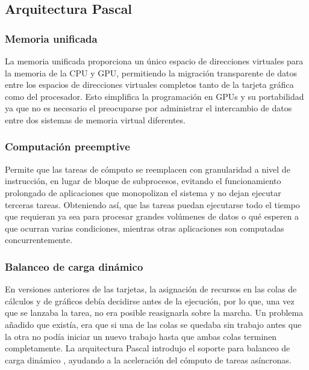\subsection{Arquitectura Pascal}

%
 
\subsubsection{Memoria unificada} 
 La memoria unificada proporciona un único espacio de direcciones virtuales para la memoria de la CPU y GPU, permitiendo la migración transparente de datos entre los espacios de direcciones virtuales completos tanto de la tarjeta gráfica como del procesador. Esto simplifica la programación en GPUs y su portabilidad ya que no es necesario el  preocuparse por administrar el intercambio de datos entre dos sistemas de memoria virtual diferentes\cite{WPNV}.
 
 
\subsubsection{Computación preemptive}
Permite que las tareas de cómputo se reemplacen con granularidad a nivel de instrucción, en lugar de bloque de subprocesos, evitando el funcionamiento prolongado de aplicaciones que monopolizan el sistema y no dejan ejecutar terceras tareas. Obteniendo así, que las tareas puedan ejecutarse todo el tiempo que requieran ya sea para procesar grandes volúmenes de datos o qué esperen a que ocurran varias condiciones, mientras otras aplicaciones son computadas concurrentemente\cite{WPNV}.

\subsubsection{Balanceo de carga dinámico}
En versiones anteriores de las tarjetas, la asignación de recursos en las colas de cálculos y de gráficos debía decidirse antes de la ejecución, por lo que, una vez que se lanzaba la tarea, no era posible reasignarla sobre la marcha. Un problema añadido que existía, era que si una de las colas se quedaba sin trabajo antes que la otra no podía iniciar un nuevo trabajo hasta que ambas colas terminen completamente\cite{PasAna}.
\vspace{0.3cm}
La arquitectura Pascal introdujo el soporte para balanceo de carga dinámico \cite{AnPasc},  ayudando a la aceleración del cómputo de tareas asíncronas.

